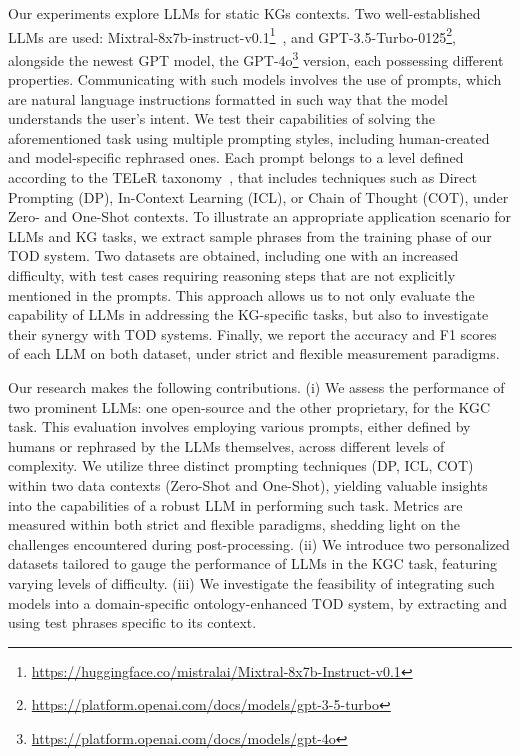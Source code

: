 \documentclass[runningheads]{llncs}
\begin{document}
Our experiments explore LLMs for static KGs contexts. Two well-established LLMs are used: Mixtral-8x7b-instruct-v0.1\footnote{\url{https://huggingface.co/mistralai/Mixtral-8x7b-Instruct-v0.1}}~\cite{mixtral}, and GPT-3.5-Turbo-0125\footnote{\url{https://platform.openai.com/docs/models/gpt-3-5-turbo}}, alongside the newest GPT model, the GPT-4o\footnote{\url{https://platform.openai.com/docs/models/gpt-4o}} version,  each possessing different properties. Communicating with such models involves the use of prompts, which are natural language instructions formatted in such way that the model understands the user’s intent. We test their capabilities of solving the aforementioned task using multiple prompting styles, including human-created and model-specific rephrased ones. Each prompt belongs to a level defined according to the TELeR taxonomy~\cite{teler2023}, that includes techniques such as Direct Prompting (DP), In-Context Learning (ICL), or Chain of Thought (COT), under Zero- and One-Shot contexts. To illustrate an appropriate application scenario for LLMs and KG tasks, we extract sample phrases from the training phase of our TOD system. Two datasets are obtained, including one with an increased difficulty, with test cases requiring reasoning steps that are not explicitly mentioned in the prompts. This approach allows us to not only evaluate the capability of LLMs in addressing the KG-specific tasks, but also to investigate their synergy with TOD systems. Finally, we report the accuracy and F1 scores of each LLM on both dataset, under strict and flexible measurement paradigms. 

Our research makes the following contributions. (i)	We assess the performance of two prominent LLMs: one open-source and the other proprietary, for the KGC task. This evaluation involves employing various prompts, either defined by humans or rephrased by the LLMs themselves, across different levels of complexity. We utilize three distinct prompting techniques (DP, ICL, COT) within two data contexts (Zero-Shot and One-Shot), yielding valuable insights into the capabilities of a robust LLM in performing such task. Metrics are measured within both strict and flexible paradigms, shedding light on the challenges encountered during post-processing. (ii) We introduce two personalized datasets tailored to gauge the performance of LLMs in the KGC task, featuring varying levels of difficulty. (iii) We investigate the feasibility of integrating such models into a domain-specific ontology-enhanced TOD system, by extracting and using test phrases specific to its context.
\end{document}
